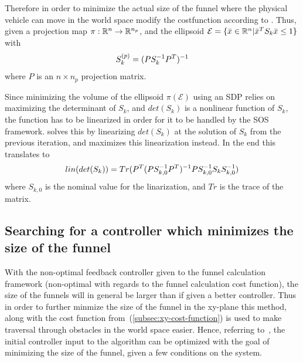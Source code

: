 Therefore in order to minimize the actual size of the funnel where the physical
vehicle can move in the world space modify the costfunction according to
\cite{majumdarFunnelLibrariesRealtime2017}. Thus, given a projection map \(\pi :
\mathbb{R}^n \rightarrow \mathbb{R}^{n_p}\), and the ellipsoid \(\mathcal{E} = \lbrace\bar{x} \in
  \mathbb{R}^n | \bar{x}^TS_{k}\bar{x} \leq 1\rbrace\) with
\[
  S_k^{(p)} = \lparen PS_k^{-1}P^T\rparen^{-1}
\]
where \(P\) is an \(n\times n_p\) projection matrix.

Since minimizing the volume of the ellipsoid \(\pi(\mathcal{E})\) using an \ac{SDP}
relies on maximizing the determinant of \(S_k\), and \(det(S_k)\) is a nonlinear
function of \(S_k\), the function has to be linearized in order for it to be
handled by the \ac{SOS}
framework. \cite[Majumdar]{majumdarFunnelLibrariesRealtime2017} solves this by
linearizing \(det(S_k)\) at the solution of \(S_k\) from the previous iteration,
and maximizes this linearization instead. In the end this translates to
\[
  \mathnormal{lin}\lparen det\lparen S_k\rparen\rparen =
  Tr\lparen P^T\lparen PS_{k,0}^{-1}P^T\rparen^{-1}PS_{k,0}^{-1}S_kS_{k,0}^{-1}\rparen
\]
where \(S_{k,0}\) is the nominal value for the linarization, and \(Tr\) is the
trace of the matrix.

\subsection{Searching for a controller which minimizes the size of the funnel}

With the non-optimal feedback controller given to the funnel calculation
framework (non-optimal with regards to the funnel calculation cost function),
the size of the funnels will in general be larger than if given a better
controller. Thus in order to further minmize the size of the funnel in the
xy-plane this method, along with the cost function
from~(\ref{subsec:xy-cost-function}) is used to make traversal through obstacles
in the world space easier. Hence, referring to~\cite[Majumdar.sec~4.3.2
(Feedback control synthesis)]{majumdarFunnelLibrariesRealtime2017}, the initial
controller input to the algorithm can be optimized with the goal of minimizing
the size of the funnel, given a few conditions on the system.

